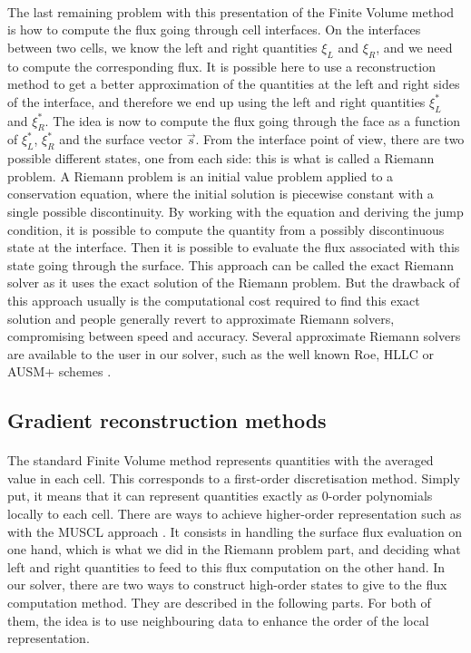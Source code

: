      \paragraph{}
      The last remaining problem with this presentation of the Finite Volume method is how to compute the flux going through cell interfaces.
      On the interfaces between two cells, we know the left and right quantities $\xi_L$ and $\xi_R$, and we need to compute the corresponding flux.
      It is possible here to use a reconstruction method to get a better approximation of the quantities at the left and right sides of the interface, and therefore we end up using the left and right quantities $\xi_L^*$ and $\xi_R^*$.
      The idea is now to compute the flux going through the face as a function of $\xi_L^*$, $\xi_R^*$ and the surface vector $\vec{s}$.
      From the interface point of view, there are two possible different states, one from each side: this is what is called a Riemann problem.
      A Riemann problem is an initial value problem applied to a conservation equation, where the initial solution is piecewise constant with a single possible discontinuity.
      By working with the equation and deriving the jump condition, it is possible to compute the quantity from a possibly discontinuous state at the interface.
      Then it is possible to evaluate the flux associated with this state going through the surface.
      This approach can be called the exact Riemann solver as it uses the exact solution of the Riemann problem.
      But the drawback of this approach usually is the computational cost required to find this exact solution and people generally revert to approximate Riemann solvers, compromising between speed and accuracy.
      Several approximate Riemann solvers are available to the user in our solver, such as the well known Roe, HLLC or AUSM+ schemes \cite{Roe1981, Toro2009}.


    \subsection{Gradient reconstruction methods}

      \paragraph{}
      The standard Finite Volume method represents quantities with the averaged value in each cell.
      This corresponds to a first-order discretisation method.
      Simply put, it means that it can represent quantities exactly as 0-order polynomials locally to each cell.
      There are ways to achieve higher-order representation such as with the MUSCL approach \cite{VanLeer1979}.
      It consists in handling the surface flux evaluation on one hand, which is what we did in the Riemann problem part, and deciding what left and right quantities to feed to this flux computation on the other hand.
      In our solver, there are two ways to construct high-order states to give to the flux computation method.
      They are described in the following parts.
      For both of them, the idea is to use neighbouring data to enhance the order of the local representation.


